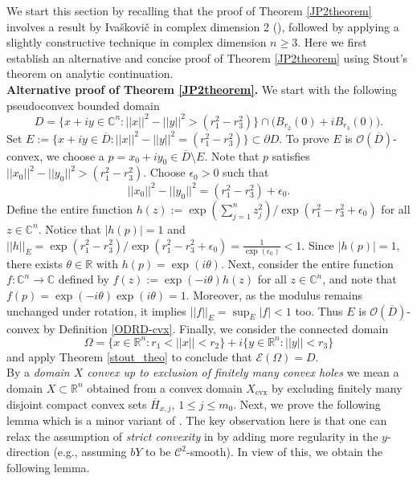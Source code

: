 \documentclass[12pt,reqno, a4paper]{amsart}
\theoremstyle{definition}
\theoremstyle{definition}
\numberwithin{equation}{section}
\def\R{\mathbb{R}}                              %
\def\C{\mathbb{C}}                              %
\begin{document}
We start this section by recalling that the proof of Theorem \ref{JP2theorem} involves a result by Iva\v skovi\v c in complex dimension 2 (\cite[Lemma 8]{ivas}), followed by applying a slightly constructive technique in complex dimension $n\geq 3$. Here we first establish an  alternative and concise proof of Theorem \ref{JP2theorem} using Stout's theorem on analytic continuation.\\


\textbf{Alternative proof of Theorem \ref{JP2theorem}.}
We start with the following pseudoconvex bounded domain $$D=\Big\{x+iy\in \C^n:||x||^2-||y||^2>(r_1^2-r_3^2)\Big\}\cap \Big(B_{r_2}(0)+iB_{r_3}(0)\Big).$$
Set $E:=\{x+iy\in \overline{D}:||x||^2-||y||^2=(r_1^2-r_3^2)\} \subset \partial D.$ To prove $E$ is $\mathcal{O}(\overline{D})$-convex,  
we choose a $p=x_0+iy_0\in \overline{D}\setminus E$. 
Note that $p$ satisfies ${||x_0||^2-||y_0||^2>(r_1^2-r_3^2)}$. Choose $\epsilon_0>0$ such that $$||x_0||^2-||y_0||^2=(r_1^2-r_3^2)+\epsilon_0.$$
Define the entire function $h(z):=\exp({\sum_{j=1}^{n}z_j^2})/\exp({r_1^2-r_3^2+\epsilon_0})$ for all $z\in \C^n$. Notice that $|h(p)|=1$ and ${||h||_E=\exp(r_1^2-r_3^2)/\exp({r_1^2-r_3^2+\epsilon_0})= \frac{1}{\exp(\epsilon_0)}<1}.$
Since $|h(p)|=1$, there exists $\theta\in \R$ with $h(p)=\exp(i\theta)$. Next, consider the entire function $f:\C^n \to \C$ defined by ${f(z):=\exp(-i\theta)h(z)}$ for all $z\in \C^n$, and note that ${f(p)=\exp(-i\theta)\exp(i\theta)=1.}$ Moreover, as the modulus remains unchanged under rotation, it implies $||f||_E=\sup_E|f|<1$ too. Thus $E$ is $\mathcal{O}(\overline{D})$-convex by Definition \ref{ODRD-cvx}. Finally, we consider the connected domain $$\Omega=\{x \in \R^n: r_1<||x||<r_2\}+i\{y \in \R^n: ||y||<r_3\}$$ and apply Theorem \ref{stout_theo} to conclude that $\mathcal{E}(\Omega)=D.$\\



By a \emph{domain $X$ convex up to exclusion of finitely many convex holes} we mean a domain $X\subset\R^n$ obtained from a convex domain $X_{\text{cvx}}$ by excluding finitely many disjoint compact convex sets $\overline{H}_{x,j}$, $1\leq j\leq m_0$. Next, we prove the following lemma which is a minor variant of \cite[Lemma 4.1]{haz-por}. The key observation here is that one can relax the assumption of \textit{strict convexity} in \cite[Lemma 4.1]{haz-por} by adding more regularity in the $y$-direction (e.g., assuming $bY$ to be $\mathcal{C}^2$-smooth). In view of this, we obtain the following lemma. 
\end{document}
